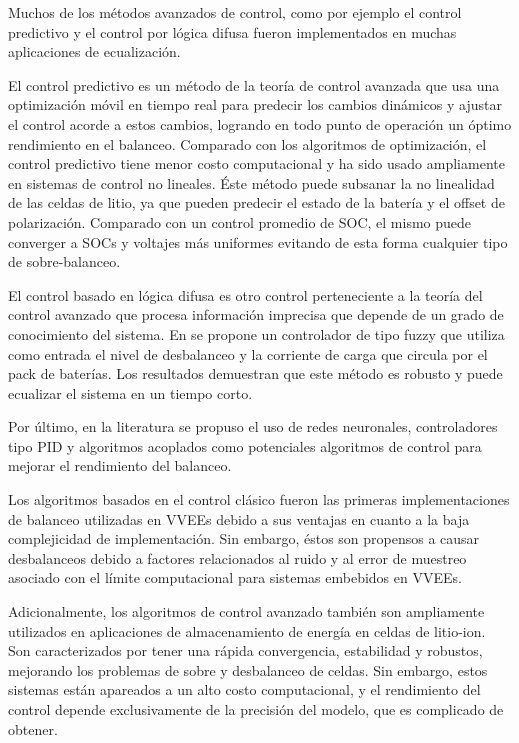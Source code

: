 \documentclass[10pt,a4paper]{article}
\newcounter{subsubsubsection}[subsubsection]
\begin{document}

Muchos de los m\'etodos avanzados de control, como por ejemplo el control
predictivo y el control por l\'ogica difusa fueron implementados en muchas
aplicaciones de ecualizaci\'on.

El control predictivo es un m\'etodo de la teor\'ia de control avanzada que usa
una optimizaci\'on m\'ovil en tiempo real para predecir los cambios din\'amicos
y ajustar el control acorde a estos cambios, logrando en todo punto de 
operaci\'on un \'optimo rendimiento en el balanceo. Comparado con los
algoritmos de optimizaci\'on, el control predictivo tiene menor costo
computacional y ha sido usado ampliamente en sistemas de control no lineales.
\'Este m\'etodo puede subsanar la no linealidad de las celdas de litio, ya que
pueden predecir el estado de la bater\'ia y el offset de polarizaci\'on.
Comparado con un control promedio de \acrshort{SOC}, el mismo puede converger a
\acrshort{SOC}s y voltajes m\'as uniformes evitando de esta forma cualquier tipo
de sobre-balanceo.

El control basado en l\'ogica difusa es otro control perteneciente a la teor\'ia
del control avanzado que procesa informaci\'on imprecisa que depende de un grado
de conocimiento del sistema. En \cite{jia_et_al_fuzzy} se propone un controlador 
de tipo fuzzy que utiliza como entrada el nivel de desbalanceo y la corriente de 
carga que circula por el pack de bater\'ias. Los resultados demuestran que este 
m\'etodo es robusto y puede ecualizar el sistema en un tiempo corto.

Por \'ultimo, en la literatura se propuso el uso de redes neuronales,
controladores tipo PID y algoritmos acoplados como potenciales algoritmos de
control para mejorar el rendimiento del balanceo.


Los algoritmos basados en el control cl\'asico fueron las primeras
implementaciones de balanceo utilizadas en \acrshort{VVEE}s debido a sus 
ventajas en cuanto a la baja complejicidad de implementaci\'on. Sin embargo, 
\'estos son propensos a causar desbalanceos debido a factores relacionados al 
ruido y al error de muestreo asociado con el l\'imite computacional para 
sistemas embebidos en \acrshort{VVEE}s.

Adicionalmente, los algoritmos de control avanzado tambi\'en son ampliamente
utilizados en aplicaciones de almacenamiento de energ\'ia en celdas de
litio-ion. Son caracterizados por tener una r\'apida convergencia, estabilidad y
robustos, mejorando los problemas de sobre y desbalanceo de celdas. Sin embargo,
estos sistemas est\'an apareados a un alto costo computacional, y el rendimiento
del control depende exclusivamente de la precisi\'on del modelo, que es
complicado de obtener.
\end{document}
